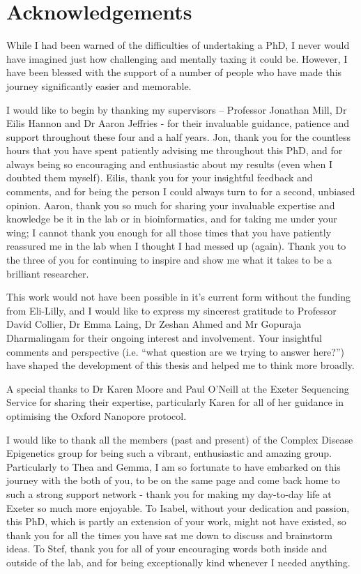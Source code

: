 \chapter*{Acknowledgements}

\begingroup
\singlespacing
While I had been warned of the difficulties of undertaking a PhD, I never would have imagined just how challenging and mentally taxing it could be. However, I have been blessed with the support of a number of people who have made this journey significantly easier and memorable. 

I would like to begin by thanking my supervisors – Professor Jonathan Mill, Dr Eilis Hannon and Dr Aaron Jeffries - for their invaluable guidance, patience and support throughout these four and a half years. Jon, thank you for the countless hours that you have spent patiently advising me throughout this PhD, and for always being so encouraging and enthusiastic about my results (even when I doubted them myself). Eilis, thank you for your insightful feedback and comments, and for being the person I could always turn to for a second, unbiased opinion. Aaron, thank you so much for sharing your invaluable expertise and knowledge be it in the lab or in bioinformatics, and for taking me under your wing; I cannot thank you enough for all those times that you have patiently reassured me in the lab when I thought I had messed up (again). Thank you to the three of you for continuing to inspire and show me what it takes to be a brilliant researcher. 

This work would not have been possible in it's current form without the funding from Eli-Lilly, and I would like to express my sincerest gratitude to Professor David Collier, Dr Emma Laing, Dr Zeshan Ahmed and Mr Gopuraja Dharmalingam for their ongoing interest and involvement. Your insightful comments and perspective (i.e. “what question are we trying to answer here?”) have shaped the development of this thesis and helped me to think more broadly. 

A special thanks to Dr Karen Moore and Paul O’Neill at the  Exeter Sequencing Service for sharing their expertise, particularly Karen for all of her guidance in optimising the Oxford Nanopore protocol.

I would like to thank all the members (past and present) of the Complex Disease Epigenetics group for being such a vibrant, enthusiastic and amazing group. Particularly to Thea and Gemma, I am so fortunate to have embarked on this journey with the both of you, to be on the same page and come back home to such a strong support network - thank you for making my day-to-day life at Exeter so much more enjoyable. To Isabel, without your dedication and passion, this PhD, which is partly an extension of your work, might not have existed, so thank you for all the times you have sat me down to discuss and brainstorm ideas. To Stef, thank you for all of your encouraging words both inside and outside of the lab, and for being exceptionally kind whenever I needed anything. 

